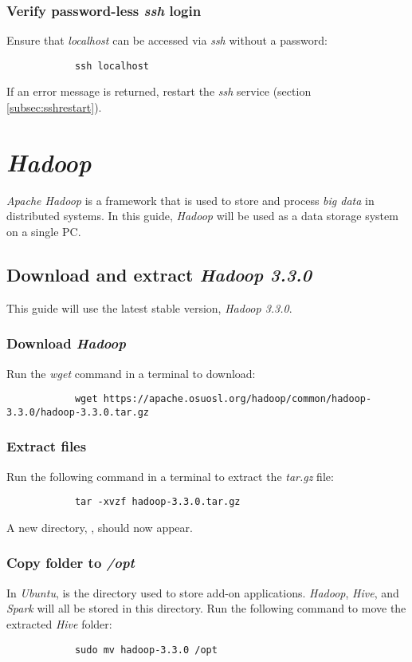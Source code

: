 \documentclass{article}
\begin{document}
        \subsubsection{Verify password-less \emph{ssh} login}
        Ensure that \emph{localhost} can be accessed via \emph{ssh} without a password:
        \begin{verbatim}
            ssh localhost
        \end{verbatim}
        If an error message is returned, restart the \emph{ssh} service (section \ref{subsec:sshrestart}).

\section{\emph{Hadoop}}
\emph{Apache Hadoop} is a framework that is used to store and process \emph{big data} in distributed systems.
In this guide, \emph{Hadoop} will be used as a data storage system on a single PC.

    \subsection{Download and extract \emph{Hadoop 3.3.0}}
    This guide will use the latest stable version, \emph{Hadoop 3.3.0}.
    
        \subsubsection{Download \emph{Hadoop}}
        Run the \emph{wget} command in a terminal to download:
        \begin{verbatim}
            wget https://apache.osuosl.org/hadoop/common/hadoop-3.3.0/hadoop-3.3.0.tar.gz
        \end{verbatim}

        \subsubsection{Extract files}
        Run the following command in a terminal to extract the \emph{tar.gz} file:
        \begin{verbatim}
            tar -xvzf hadoop-3.3.0.tar.gz
        \end{verbatim}
        A new directory, , should now appear.

        \subsubsection{Copy folder to \emph{/opt}}
        In \emph{Ubuntu},  is the directory used to store add-on applications. \emph{Hadoop},
        \emph{Hive}, and \emph{Spark} will all be stored in this directory. Run the following command to
        move the extracted \emph{Hive} folder:
        \begin{verbatim}
            sudo mv hadoop-3.3.0 /opt
        \end{verbatim}
    
\end{document}
